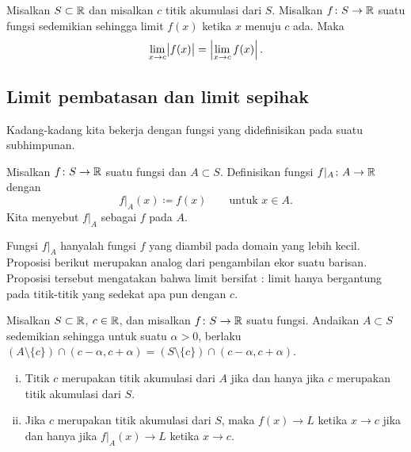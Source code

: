 \begin{cor} \label{fabs:cor}
Misalkan $S \subset {\mathbb{R}}$ dan misalkan $c$ titik akumulasi dari $S$.
Misalkan $f \colon S \to {\mathbb{R}}$ suatu fungsi sedemikian sehingga limit $f(x)$ ketika $x$ menuju $c$
ada.
Maka
\begin{equation*}
\lim_{x\to c} \bigl\lvert {f(x)} \bigr\rvert =
\left\lvert {\lim_{x\to c} f(x)} \right\rvert.
\end{equation*}
\end{cor}

\subsection{Limit pembatasan dan limit sepihak}

Kadang-kadang kita bekerja dengan fungsi yang didefinisikan pada suatu subhimpunan.

\begin{defn}
Misalkan $f \colon S \to {\mathbb{R}}$ suatu fungsi dan $A \subset S$.  Definisikan
fungsi $f|_A \colon A \to {\mathbb{R}}$ dengan
\begin{equation*}
f|_A (x) \coloneqq f(x)  \qquad \text{untuk } x \in A.
\end{equation*}
Kita menyebut $f|_A$ sebagai \emph{} $f$ pada $A$.
\end{defn}

Fungsi $f|_A$ hanyalah fungsi $f$ yang diambil pada domain yang lebih kecil.
Proposisi berikut merupakan analog dari pengambilan ekor suatu barisan.
Proposisi tersebut mengatakan bahwa limit bersifat : limit hanya bergantung pada titik-titik
yang sedekat apa pun dengan $c$.

\begin{prop} \label{prop:limrest}
Misalkan $S \subset {\mathbb{R}}$, $c \in {\mathbb{R}}$, dan
misalkan $f \colon S
\to {\mathbb{R}}$ suatu fungsi.
Andaikan
$A \subset S$ sedemikian sehingga untuk suatu $\alpha > 0$, berlaku
$(A \setminus \{ c \}) \cap (c-\alpha,c+\alpha) = (S \setminus \{ c \}) \cap (c-\alpha,c+\alpha)$.
\begin{enumerate}[(i)]
\item Titik $c$ merupakan titik akumulasi dari $A$ jika dan hanya jika $c$ merupakan titik akumulasi
dari $S$.
\item Jika $c$ merupakan titik akumulasi dari $S$, maka $f(x) \to L$ ketika $x \to c$ jika dan hanya jika
$f|_A(x) \to L$ ketika $x \to c$.
\end{enumerate}
\end{prop}

